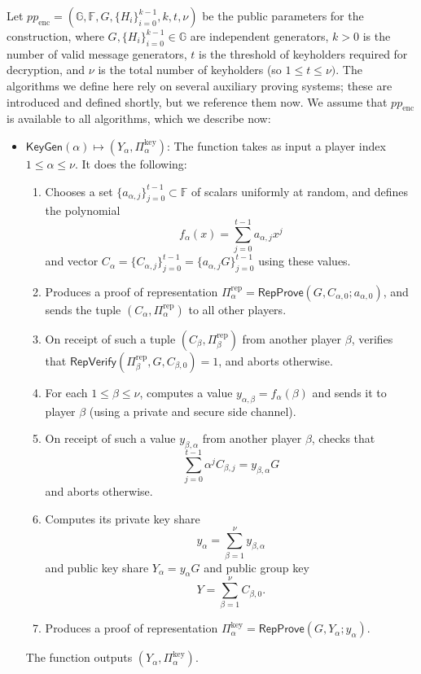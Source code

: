 \documentclass{llncs}
\newcommand{\G}{\mathbb{G}}
\newcommand{\F}{\mathbb{F}}
\newcommand{\func}[1]{\mathsf{#1}}
\begin{document}
Let $pp_{\text{enc}} = (\G, \F, G, \{H_i\}_{i=0}^{k-1}, k, t, \nu)$ be the public parameters for the construction, where $G, \{H_i\}_{i=0}^{k-1} \in \G$ are independent generators, $k > 0$ is the number of valid message generators, $t$ is the threshold of keyholders required for decryption, and $\nu$ is the total number of keyholders (so $1 \leq t \leq \nu)$.
The algorithms we define here rely on several auxiliary proving systems; these are introduced and defined shortly, but we reference them now.
We assume that $pp_{\text{enc}}$ is available to all algorithms, which we describe now:
\begin{itemize}
    \item $\func{KeyGen}(\alpha) \mapsto (Y_\alpha, \Pi_\alpha^{\text{key}})$: The function takes as input a player index $1 \leq \alpha \leq \nu$.
    It does the following:
    \begin{enumerate}
        \item Chooses a set $\{a_{\alpha,j}\}_{j=0}^{t-1} \subset \F$ of scalars uniformly at random, and defines the polynomial \[ f_\alpha(x) = \sum_{j=0}^{t-1} a_{\alpha,j}x^j\] and vector $C_\alpha = \{C_{\alpha,j}\}_{j=0}^{t-1} = \{a_{\alpha,j}G\}_{j=0}^{t-1}$ using these values.
        \item Produces a proof of representation $\Pi_\alpha^{\text{rep}} = \func{RepProve}(G, C_{\alpha,0} ; a_{\alpha,0})$, and sends the tuple $(C_\alpha, \Pi_\alpha^{\text{rep}})$ to all other players.
        \item On receipt of such a tuple $(C_\beta, \Pi_\beta^{\text{rep}})$ from another player $\beta$, verifies that $\func{RepVerify}(\Pi_\beta^{\text{rep}}, G, C_{\beta,0}) = 1$, and aborts otherwise.
        \item For each $1 \leq \beta \leq \nu$, computes a value $y_{\alpha, \beta} = f_\alpha(\beta)$ and sends it to player $\beta$ (using a private and secure side channel).
        \item On receipt of such a value $y_{\beta,\alpha}$ from another player $\beta$, checks that \[ \sum_{j=0}^{t-1} \alpha^jC_{\beta,j} = y_{\beta,\alpha}G \] and aborts otherwise.
        \item Computes its private key share \[ y_\alpha = \sum_{\beta=1}^{\nu} y_{\beta,\alpha} \] and public key share $Y_\alpha = y_\alpha G$ and public group key \[ Y = \sum_{\beta=1}^{\nu} C_{\beta,0}. \]
        \item Produces a proof of representation $\Pi_\alpha^{\text{key}} = \func{RepProve}(G, Y_\alpha ; y_\alpha)$.
    \end{enumerate}
    The function outputs $(Y_\alpha, \Pi_\alpha^{\text{key}})$.
    

\end{itemize}
\end{document}
